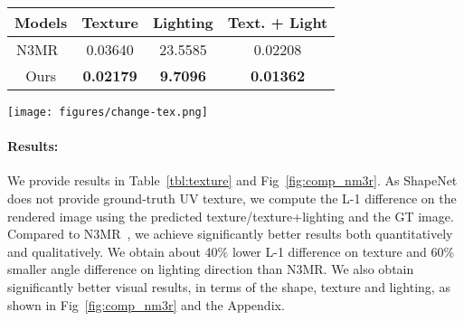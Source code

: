 \documentclass{article}
\begin{document}
\begin{minipage}[t] {0.09\textwidth}
\begin{table*}
\vspace{-3.5mm}
\begin{minipage}{0.45\linewidth}
\vspace{-3mm}
    \begin{center}
{\small
        \addtolength{\tabcolsep}{-2.5pt}
        \begin{tabular}{cccc}
            \toprule
            Models &Texture&Lighting & Text. + Light \\
            \toprule
            N3MR~\cite{NMR} & 0.03640 & 23.5585 &0.02208\\
            Ours &\textbf{0.02179}&\textbf{9.7096}&\textbf{0.01362}\\
            \bottomrule
        \end{tabular}
        }
    \end{center}
    \end{minipage}
    \hspace{3mm}
    \begin{minipage}{0.52\linewidth}
        
\caption{\footnotesize Results for texture and light prediction. Texture/Texture+Light shows L-1 loss on the rendered image for texture/texture+lighting. Lighting shows the angle between predicted lighting and GT lighting. Lower is better.}
    \label{tbl:texture}
        \end{minipage}
        \vspace{-1mm}
\end{table*}


\begin{figure*}[t!]
\vspace{-4.5mm}
\texttt{[image: figures/change-tex.png]}
\vspace{-5.5mm}
\caption{\footnotesize{Qualitative examples for 3D shape, texture and light prediction. Col. 1-3: 1) GT rendered image with texture+light, 2) texture only rendered image, 3) light map. Col 4-6: our predictions. Col: 7-9: N3MR~\cite{NMR}}}
\label{fig:comp_nm3r}
\vspace{-4mm}
\end{figure*}

\vspace{-6pt}
\paragraph{Results:} We provide results in Table~\ref{tbl:texture} and Fig~\ref{fig:comp_nm3r}. As ShapeNet does not provide ground-truth UV texture, we compute the L-1 difference on the rendered image using the predicted texture/texture+lighting and the GT image. Compared to N3MR~\cite{NMR}, we achieve significantly better results both quantitatively and qualitatively. We obtain about 40\% lower L-1  difference on texture and 60\% smaller angle difference on lighting direction than N3MR. We also obtain significantly better visual results, in terms of the shape, texture and lighting, as shown in Fig~\ref{fig:comp_nm3r} and the Appendix.


\end{minipage}
\end{document}
